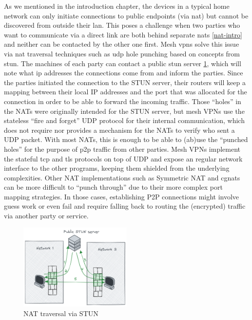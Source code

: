 As we mentioned in the introduction chapter, the devices in a typical
home network can only initiate connections to public endpoints (via
\gls{nat}) but cannot be discovered from outside their \gls{lan}. This
poses a challenge when two parties who want to communicate via a direct
link are both behind separate \glspl{nat} \ref{nat-intro} and neither
can be contacted by the other one first. Mesh \glspl{vpn} solve this
issue via \gls{nat} traversal techniques such as \gls{udp} hole punching
based on concepts from \gls{stun}. The machines of each party can
contact a public \gls{stun} server \ref{nat-traversal}, which will note
what \gls{ip} addresses the connections come from and inform the
parties. Since the parties initiated the connection to the STUN server,
their routers will keep a mapping between their local IP addresses and
the port that was allocated for the connection in order to be able to
forward the incoming traffic. Those ``holes'' in the NATs were
originally intended for the STUN server, but mesh VPNs use the stateless
``fire and forget'' UDP protocol for their internal communication, which
does not require nor provides a mechanism for the NATs to verify who
sent a UDP packet. With most NATs, this is enough to be able to (ab)use
the ``punched holes'' for the purpose of \gls{p2p} traffic from other
parties. Mesh VPNs implement the stateful \gls{tcp} and \gls{tls}
protocols on top of UDP and expose an regular network interface to the
other programs, keeping them shielded from the underlying complexities.
Other NAT implementations such as Symmetric NAT and \glspl{cgnat} can be
more difficult to ``punch through'' due to their more complex port
mapping strategies. In those cases, establishing P2P connections might
involve guess work or even fail and require falling back to routing the
(encrypted) traffic via another party or service.

\begin{figure}
\centering
\includegraphics[width=0.5\textwidth,height=0.25\textheight]{thesis/../figures/nat-traversal.png}
\caption{NAT traversal via STUN\label{nat-traversal}}
\end{figure}

